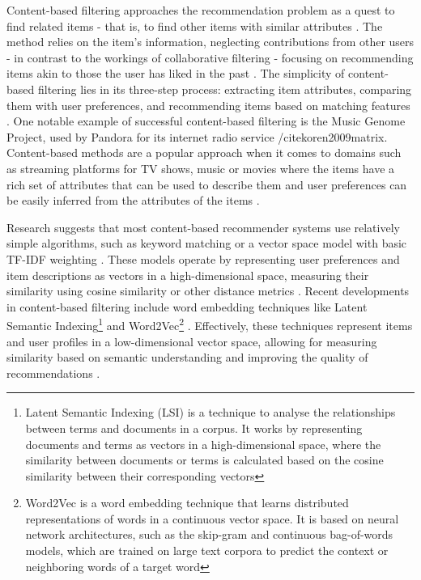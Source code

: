 Content-based filtering approaches the recommendation problem as a quest to find related items - that is, to find other items with similar attributes \cite{balabanovic1997fab}. The method relies on the item’s information, neglecting contributions from other users -  in contrast to the workings of collaborative filtering - focusing on recommending items akin to those the user has liked in the past \cite{pazzani1999framework}. The simplicity of content-based filtering lies in its three-step process: extracting item attributes, comparing them with user preferences, and recommending items based on matching features \cite{linden2003amazon}. One notable example of successful content-based filtering is the Music Genome Project, used by Pandora for its internet radio service /cite{koren2009matrix}. Content-based methods are a popular approach when it comes to domains such as streaming platforms for TV shows, music or movies where the items have a rich set of attributes that can be used to describe them and user preferences can be easily inferred from the attributes of the items \cite{chen2017fully}.

Research suggests that most content-based recommender systems use relatively simple algorithms, such as keyword matching or a vector space model with basic TF-IDF weighting \cite{musto2015word}. These models operate by representing user preferences and item descriptions as vectors in a high-dimensional space, measuring their similarity using cosine similarity or other distance metrics \cite{weihong2006commerce}. Recent developments in content-based filtering include word embedding techniques like Latent Semantic Indexing\footnote{Latent Semantic Indexing (LSI) is a technique to analyse the relationships between terms and documents in a corpus. It works by representing documents and terms as vectors in a high-dimensional space, where the similarity between documents or terms is calculated based on the cosine similarity between their corresponding vectors} \cite{chan2011web} and Word2Vec\footnote{Word2Vec is a word embedding technique that learns distributed representations of words in a continuous vector space. It is based on neural network architectures, such as the skip-gram and continuous bag-of-words models, which are trained on large text corpora to predict the context or neighboring words of a target word} \cite{ozsoy2016word}. Effectively, these techniques represent items and user profiles in a low-dimensional vector space, allowing for measuring similarity based on semantic understanding and improving the quality of recommendations \cite{mikolov2013distributed}.

